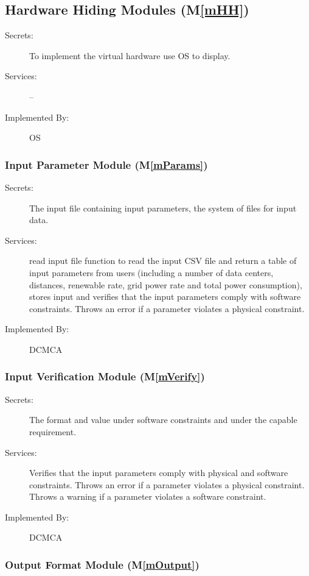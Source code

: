 \documentclass[12pt]{article}
\newcommand{\mref}[1]{M\ref{#1}}
\begin{document}
\subsection{Hardware Hiding Modules (\mref{mHH})}

\begin{description}
\item[Secrets:] To implement the virtual hardware use OS to display.
\item[Services:] --
\item[Implemented By:] OS
\end{description}

\subsubsection{Input Parameter Module (\mref{mParams})}

\begin{description}
\item[Secrets:] The input file containing input parameters, the system of files for input data.
\item[Services:] read input file function to read the input CSV file and return a table of input parameters from users (including 
  a number of data centers, distances, renewable rate, grid power rate and total power consumption), stores input and verifies that the input parameters comply with software constraints. Throws an error if a parameter violates a physical constraint.
\item[Implemented By:] DCMCA
\end{description} 
 \subsubsection{Input Verification Module (\mref{mVerify})}

\begin{description}
\item[Secrets:]  The format and value under software constraints and under the capable requirement.
\item[Services:] Verifies that the input parameters comply with physical and
   software constraints. Throws an error if a parameter violates a physical
   constraint. Throws a warning if a parameter violates a software constraint.
\item[Implemented By:] DCMCA
\end{description}

\subsubsection{Output Format Module (\mref{mOutput})}
\end{document}
